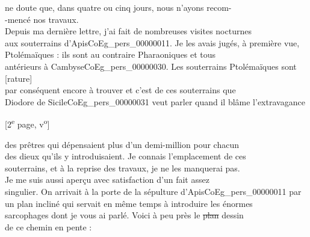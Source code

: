 \documentclass{book}
\begin{document}
ne doute que, dans quatre ou cinq jours, nous n’ayons recom-\\
-mencé nos travaux.\\
\indent Depuis ma dernière lettre, j’ai fait de nombreuses visites nocturnes\\
aux souterrains d’Apis\gls{CoEg_pers_00000011}. Je les avais jugés, à première vue,\\
Ptolémaïques : ils sont au contraire Pharaoniques et tous\\
antérieurs à Cambyse\gls{CoEg_pers_00000030}. Les souterrains Ptolémaïques sont [rature]\\
par conséquent encore à trouver et c’est de ces souterrains que\\
Diodore de Sicile\gls{CoEg_pers_00000031} veut parler quand il blâme l’extravagance
{\footnotesize \begin{center} [2\textsuperscript{e} page, v\textsuperscript{o}]\end{center}}
\noindent des prêtres qui dépensaient plus d’un demi-million pour chacun\\
des dieux qu’ils y introduisaient. Je connais l’emplacement de ces\\
souterrains, et à la reprise des travaux, je ne les manquerai pas.\\
\indent Je me suis aussi aperçu avec satisfaction d’un fait assez\\
singulier. On arrivait à la porte de la sépulture d’Apis\gls{CoEg_pers_00000011} par\\
un plan incliné qui servait en même temps à introduire les énormes\\
sarcophages dont je vous ai parlé. Voici à peu près le \sout{plan} dessin\\
de ce chemin en pente :\\
\end{document}
